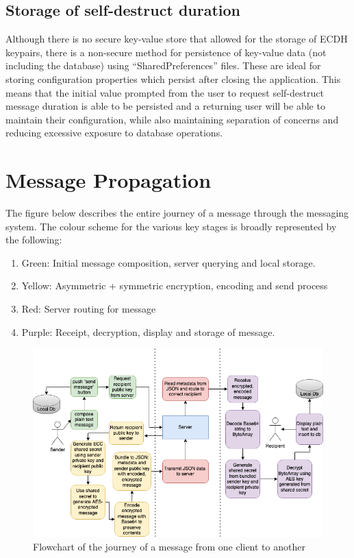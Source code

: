 \documentclass{mproj}
\begin{document}
\subsection{Storage of self-destruct duration}
Although there is no secure key-value store that allowed for the storage of ECDH keypairs, there is a non-secure method for persistence of key-value data (not including the database) using ``SharedPreferences'' files. These are ideal for storing configuration properties which persist after closing the application. This means that the initial value prompted from the user to request self-destruct message duration is able to be persisted and a returning user will be able to maintain their configuration, while also maintaining separation of concerns and reducing excessive exposure to database operations.

\section{Message Propagation}
The figure below describes the entire journey of a message through the messaging system. The colour scheme for the various key stages is broadly represented by the following:
\begin{enumerate}
	\item Green: Initial message composition, server querying and local storage.
	\item Yellow: Asymmetric + symmetric encryption, encoding and send process
	\item Red: Server routing for message
	\item Purple: Receipt, decryption, display and storage of message.
\end{enumerate}

\begin{figure}[H]
\includegraphics[scale=0.5]{images/message-flow.png}
\caption{Flowchart of the journey of a message from one client to another}
\end{figure}
\end{document}

